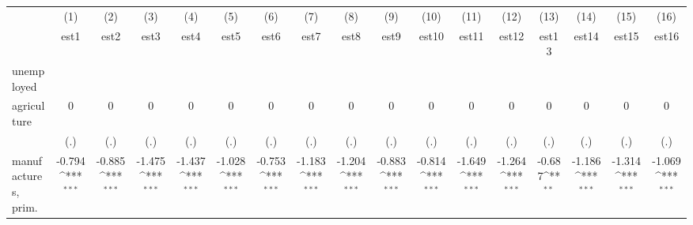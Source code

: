 {
\def\sym#1{\ifmmode^{#1}\else\(^{#1}\)\fi}
\begin{tabular}{l*{16}{c}}
\hline\hline
                    &\multicolumn{1}{c}{(1)}&\multicolumn{1}{c}{(2)}&\multicolumn{1}{c}{(3)}&\multicolumn{1}{c}{(4)}&\multicolumn{1}{c}{(5)}&\multicolumn{1}{c}{(6)}&\multicolumn{1}{c}{(7)}&\multicolumn{1}{c}{(8)}&\multicolumn{1}{c}{(9)}&\multicolumn{1}{c}{(10)}&\multicolumn{1}{c}{(11)}&\multicolumn{1}{c}{(12)}&\multicolumn{1}{c}{(13)}&\multicolumn{1}{c}{(14)}&\multicolumn{1}{c}{(15)}&\multicolumn{1}{c}{(16)}\\
                    &\multicolumn{1}{c}{est1}&\multicolumn{1}{c}{est2}&\multicolumn{1}{c}{est3}&\multicolumn{1}{c}{est4}&\multicolumn{1}{c}{est5}&\multicolumn{1}{c}{est6}&\multicolumn{1}{c}{est7}&\multicolumn{1}{c}{est8}&\multicolumn{1}{c}{est9}&\multicolumn{1}{c}{est10}&\multicolumn{1}{c}{est11}&\multicolumn{1}{c}{est12}&\multicolumn{1}{c}{est13}&\multicolumn{1}{c}{est14}&\multicolumn{1}{c}{est15}&\multicolumn{1}{c}{est16}\\
\hline
unemployed          &                     &                     &                     &                     &                     &                     &                     &                     &                     &                     &                     &                     &                     &                     &                     &                     \\
agriculture         &           0         &           0         &           0         &           0         &           0         &           0         &           0         &           0         &           0         &           0         &           0         &           0         &           0         &           0         &           0         &           0         \\
                    &         (.)         &         (.)         &         (.)         &         (.)         &         (.)         &         (.)         &         (.)         &         (.)         &         (.)         &         (.)         &         (.)         &         (.)         &         (.)         &         (.)         &         (.)         &         (.)         \\
[1em]
manufactures, prim. &      -0.794\sym{***}&      -0.885\sym{***}&      -1.475\sym{***}&      -1.437\sym{***}&      -1.028\sym{***}&      -0.753\sym{***}&      -1.183\sym{***}&      -1.204\sym{***}&      -0.883\sym{***}&      -0.814\sym{***}&      -1.649\sym{***}&      -1.264\sym{***}&      -0.687\sym{**} &      -1.186\sym{***}&      -1.314\sym{***}&      -1.069\sym{***}\\

\end{tabular}}
